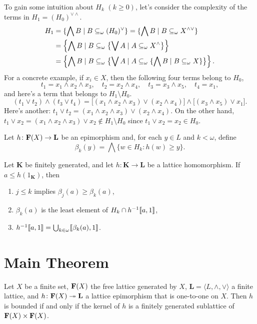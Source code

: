 To gain some intuition about $H_k$ $(k\geq 0)$, let's consider the complexity 
of the terms in $H_1 = (H_0)^{\vee \wedge}$. 
\begin{align*}
  H_1 &= \{\bigwedge B \mid B \subseteq_{\omega} (H_0)^{\vee}\}= \{\bigwedge B \mid B \subseteq_{\omega} X^{\wedge \vee}\}\\
      &= \left\{\bigwedge B \mid B \subseteq_{\omega} \bigl\{\bigvee A \mid A \subseteq_{\omega} X^\wedge \bigr\}\right\}\\
      &= \left\{\bigwedge B \mid B \subseteq_{\omega} \bigl\{\bigvee A \mid A \subseteq_{\omega} \{\bigwedge B \mid B \subseteq_{\omega} X\} \bigr\}\right\}.
\end{align*}
For a concrete example, if $x_i \in X$, then the following four
terms belong to $H_0$,
\[
t_1 = x_1 \wedge x_2 \wedge x_3, \quad t_2 = x_2 \wedge x_4, \quad t_3 = x_3 \wedge x_5, \quad t_4 = x_1,
\]
and here's a term that belongs to $H_1 \setminus H_0$.
\[
(t_1 \vee t_2) \wedge (t_3 \vee t_4) = \bigl[(x_1 \wedge x_2 \wedge x_3) \vee (x_2 \wedge x_4)\bigr] \wedge \bigl[(x_3 \wedge x_5)\vee x_1\bigr].
\]
Here's another: $t_1 \vee t_2 = (x_1 \wedge x_2 \wedge x_3) \vee (x_2 \wedge x_4)$.
On the other hand, $t_1 \vee x_2 = (x_1 \wedge x_2 \wedge x_3) \vee x_2\notin H_1\setminus H_0$
since $t_1 \vee x_2 = x_2 \in H_0$.

Let $h \colon  \mathbf{F}(X) \to \mathbf{L}$ be an epimorphism and, 
for each $y \in L$ and $k< \omega$, define
\[
\beta_k(y) = \bigwedge \{w \in H_k : h(w) \geqslant y\}.
\]

\begin{theorem}\label{thm:2.2}
   Let $\mathbf K$ be finitely generated, and let $h \colon \mathbf K \to \mathbf L$ be a lattice
  homomorphism. If $a \leq h(1_{\mathbf K})$, then
\begin{enumerate}
\item $j \leq k$ implies $\beta_j(a) \geq \beta_k(a)$,
\item  $\beta_k(a)$ is the least element of $H_k \cap h^{-1}\llbracket a, 1 \rrbracket$,
\item  $h^{-1}\llbracket a, 1 \rrbracket = \bigcup_{k\in \omega}\llbracket \beta_k(a), 1 \rrbracket$.
\end{enumerate}  
\end{theorem}

\section{Main Theorem}

\begin{theorem}
\label{thm:main}
Let $X$ be a finite set, $\mathbf{F} (X)$ the free lattice 
generated by $X$, $\mathbf L = \langle L, \wedge, \vee\rangle$ a finite lattice, and 
$h\colon \mathbf{F}(X) \twoheadrightarrow \mathbf{L}$ a lattice epimorphism 
that is one-to-one on $X$.
Then $h$ is bounded if and only if the kernel of $h$ is a finitely generated 
sublattice of $\mathbf{F} (X) \times \mathbf{F} (X)$.
\end{theorem}

